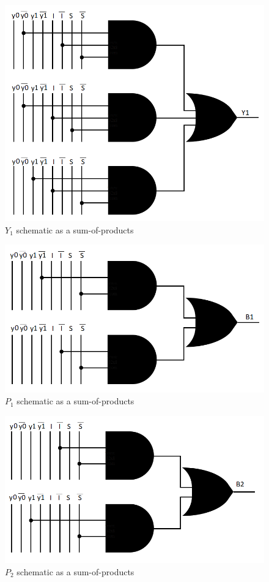 \documentclass[../../e3_tp3_main.tex]{subfiles}
\begin{document}
\begin{figure}[H]
	\centering
	\includegraphics{figures/mealy_Y1_schem.PNG}
	\caption{$Y_1$ schematic as a sum-of-products}
	\label{fig:ej1_mealy_Y1_schem}
\end{figure}
\begin{figure}[H]
	\centering
	\includegraphics{figures/mealy_B1_schem.PNG}
	\caption{$P_1$ schematic as a sum-of-products}
	\label{fig:ej1_mealy_P1_schem}
\end{figure}
\begin{figure}[H]
	\centering
	\includegraphics[scale=1]{figures/mealy_B2_schem.PNG}
	\caption{$P_2$ schematic as a sum-of-products}
	\label{fig:ej1_mealy_P2_schem}
\end{figure}
\end{document}
